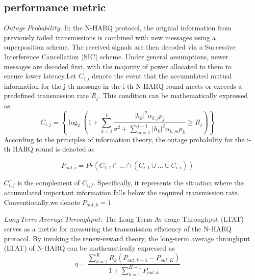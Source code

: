 \documentclass[runningheads]{llncs}
\begin{document}
\subsection{performance metric}
\par
$Outage\ Probability$: In the N-HARQ protocol, the original information from previously failed transmissions is combined with new messages using a superposition scheme. The received signals are then decoded via a Successive Interference Cancellation (SIC) scheme. Under general assumptions, newer messages are decoded first, with the majority of power allocated to them to ensure lower latency.Let  $C_{i,j}$ denote the event that the accumulated mutual information for the j-th message in the i-th N-HARQ round meets or exceeds a predefined transmission rate $R_j$. This condition can be mathematically expressed as
$$
C_{i,j}=\left\{ \left. \log _2\left( 1+\sum_{k=j}^i{\frac{\left| h_k \right|^2\alpha _{k,j}p_j}{\sigma ^2+\sum_{m=1}^{j-1}{\left| h_k \right|^2\alpha _{k,m}p_k}}}\ge R_j \right) \right\} \right. 
$$
According to the principles of information theory, the outage probability for the i-th HARQ round is denoted as 
\par
$$
P_{out,i}=Pr\left( C_{1,1}^{-}\cap ...\cap \left( C_{i,1}^{-}\cup ...\cup C_{i,i}^{-} \right) \right) 
$$
\par
$C_{i,j}^{-}$ is the complement of $C_{i,j}$. Specifically, it represents the situation where the accumulated important information falls below the required transmission rate. Conventionally,we denote $P_{out,0}=1$
\par
$Long\ Term\ Average\ Throughput$: The Long Term Average Throughput (LTAT) serves as a metric for measuring the transmission efficiency of the N-HARQ protocol. By invoking the renew-reward theory, the long-term average throughput (LTAT) of N-HARQ can be mathematically expressed as
$$
\eta =\frac{\sum_{k=1}^K{R_k\left( P_{out,k-1}-P_{out,K} \right)}}{1+\sum_{k=1}^{K-1}{P_{out,k}}}
$$
\end{document}
